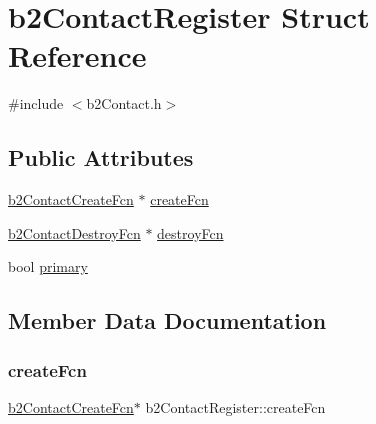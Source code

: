 \hypertarget{structb2_contact_register}{}\section{b2\+Contact\+Register Struct Reference}
\label{structb2_contact_register}


{\ttfamily \#include $<$b2\+Contact.\+h$>$}

\subsection*{Public Attributes}
\begin{DoxyCompactItemize}
\item 
\mbox{\hyperlink{b2_contact_8h_a8c349419089565d4b718438978e2e098}{b2\+Contact\+Create\+Fcn}} $\ast$ \mbox{\hyperlink{structb2_contact_register_ae065de11ab2f164bd1b8e3a461b41824}{create\+Fcn}}
\item 
\mbox{\hyperlink{b2_contact_8h_a13f1fcd7bbd3900e53e6ddf8a76428e7}{b2\+Contact\+Destroy\+Fcn}} $\ast$ \mbox{\hyperlink{structb2_contact_register_a95862aec746f5fd6ffa00a6729dec61f}{destroy\+Fcn}}
\item 
bool \mbox{\hyperlink{structb2_contact_register_a43f2d79909505b785b9034b21a56525e}{primary}}
\end{DoxyCompactItemize}


\subsection{Member Data Documentation}
\mbox{\label{structb2_contact_register_ae065de11ab2f164bd1b8e3a461b41824}} 
\subsubsection{\texorpdfstring{createFcn}{createFcn}}
{\footnotesize\ttfamily \mbox{\hyperlink{b2_contact_8h_a8c349419089565d4b718438978e2e098}{b2\+Contact\+Create\+Fcn}}$\ast$ b2\+Contact\+Register\+::create\+Fcn}

\mbox{\label{structb2_contact_register_a95862aec746f5fd6ffa00a6729dec61f}} 
